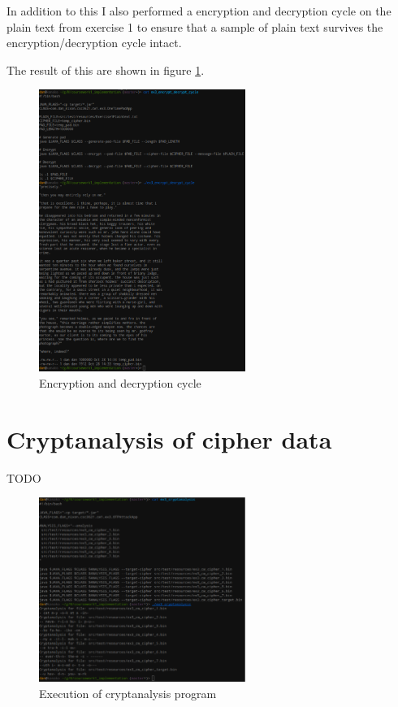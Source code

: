 \documentclass[a4paper]{article}
\begin{document}
In addition to this I also performed a encryption and decryption cycle on the
plain text from exercise 1 to ensure that a sample of plain text survives the
encryption/decryption cycle intact.

The result of this are shown in figure \ref{fig:enc_dec_cycle}.

\begin{figure}[h!]
  \centering
  \includegraphics[width=0.6\textwidth]{graphics/ex3_enc_dec_cycle.eps}
  \caption{Encryption and decryption cycle}
  \label{fig:enc_dec_cycle}
\end{figure}

\section{Cryptanalysis of cipher data}

TODO

\begin{figure}[h!]
  \centering
  \includegraphics[width=0.6\textwidth]{graphics/ex3_cryptanalysis_1.eps}
  \caption{Execution of cryptanalysis program}
  \label{fig:cryptanalysis}
\end{figure}
\end{document}
